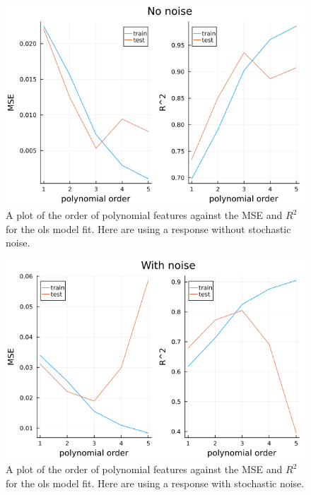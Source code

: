 \documentclass{article}
\begin{document}
\begin{figure}
    \centerline{\includegraphics[scale=0.5]{linearregression_no_noise}}
    \caption{A plot of the order of polynomial features against the MSE and $R^2$ for the ols model fit. Here are using a response without stochastic noise.}
    \label{linearregression-no-noise}
\end{figure}

\begin{figure}
    \centerline{\includegraphics[scale=0.5]{linearregression_with_noise}}
    \caption{A plot of the order of polynomial features against the MSE and $R^2$ for the ols model fit. Here are using a response with stochastic noise.}
    \label{linearregression-with-noise}
\end{figure}
\end{document}
